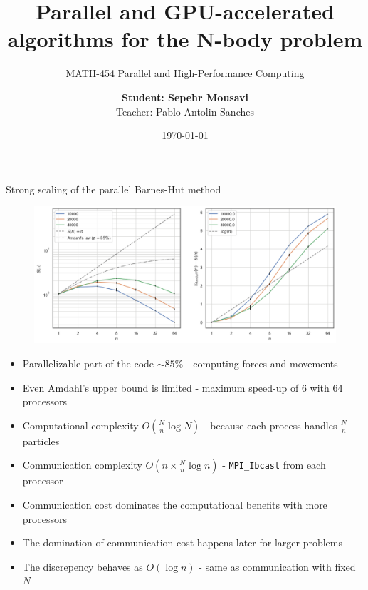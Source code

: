 \documentclass[8pt]{beamer}
\author{
    \textbf{Student: Sepehr Mousavi} \\
    Teacher: Pablo Antolin Sanches
}
\title[Parallelization of the N-Body problem]{Parallel and GPU-accelerated algorithms for the N-body problem}
\subtitle[P-HPC]{MATH-454 Parallel and High-Performance Computing}
\institute[EPFL]{{École Polytechnique Fédérale de Lausanne}}
\date{\today}
\newcommand{\code}[1]{{\small \texttt{#1}}}
\begin{document}
\frame{\titlepage}

\begin{frame}{Strong scaling of the parallel Barnes-Hut method}

    \begin{figure}
        \centering
        \includegraphics[width=.8\textwidth]{img/strongscaling.png}
    \end{figure}

    \begin{itemize}
        \item Parallelizable part of the code $\sim 85\%$ - {\small computing forces and movements}
        \item Even Amdahl's upper bound is limited - {\small maximum speed-up of 6 with 64 processors}
        \item Computational complexity $O(\frac{N}{n} \log N)$ - {\small because each process handles $\frac{N}{n}$ particles}
        \item Communication complexity $O(n \times \frac{N}{n} \log n)$ - {\small \code{MPI\_Ibcast} from each processor}
        \item Communication cost dominates the computational benefits with more processors
        \item The domination of communication cost happens later for larger problems
        \item The discrepency behaves as $O(\log n)$ - {\small same as communication with fixed $N$}
    \end{itemize}

\end{frame}
\end{document}
